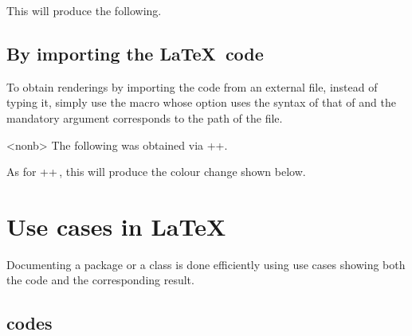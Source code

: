 

\begin{tdocexa}
    \leavevmode



    This will produce the following.

    \medskip

    

\end{tdocexa}


\subsection{By importing the \LaTeX\ code}

To obtain renderings by importing the code from an external file, instead of typing it, simply use the  macro whose option uses the syntax of that of  and the mandatory argument corresponds to the path of the file.


\begin{tdocexa}<nonb>
    The following was obtained via \tdocinlatex++.

    \medskip



    \medskip

    As for \tdocinlatex++\,, this will produce the colour change shown below.

    \medskip


\end{tdocexa}


\section{Use cases in \LaTeX}

Documenting a package or a class is done efficiently using use cases showing both the code and the corresponding result.



\subsection{ codes} \label{tdoc-listing-inline}

